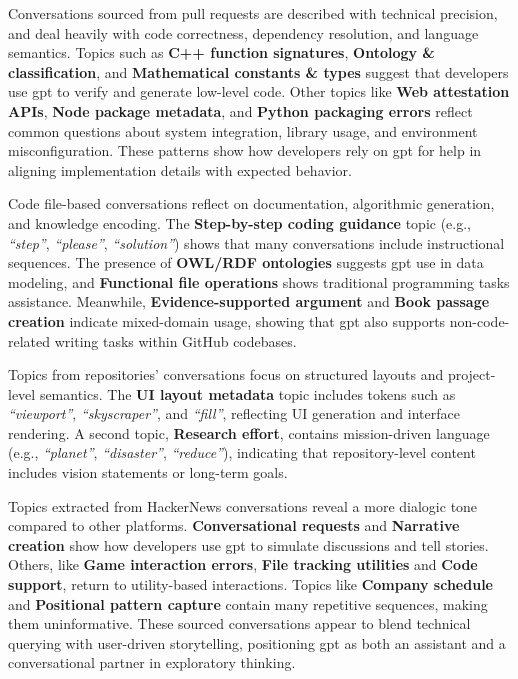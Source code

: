 Conversations sourced from pull requests are described with technical precision, and deal heavily with code correctness, dependency resolution, and language semantics. Topics such as \textbf{C++ function signatures}, \textbf{Ontology \& classification}, and \textbf{Mathematical constants \& types} suggest that developers use \acrshort{gpt} to verify and generate low-level code. Other topics like \textbf{Web attestation APIs}, \textbf{Node package metadata}, and \textbf{Python packaging errors} reflect common questions about system integration, library usage, and environment misconfiguration. These patterns show how developers rely on \acrshort{gpt} for help in aligning implementation details with expected behavior.

Code file-based conversations reflect on documentation, algorithmic generation, and knowledge encoding. The \textbf{Step-by-step coding guidance} topic (e.g., \textit{``step''}, \textit{``please''}, \textit{``solution''}) shows that many conversations include instructional sequences. The presence of \textbf{OWL/RDF ontologies} suggests \acrshort{gpt} use in data modeling, and \textbf{Functional file operations} shows traditional programming tasks assistance. Meanwhile, \textbf{Evidence-supported argument} and \textbf{Book passage creation} indicate mixed-domain usage, showing that \acrshort{gpt} also supports non-code-related writing tasks within GitHub codebases. 

Topics from repositories' conversations focus on structured layouts and project-level semantics. The \textbf{UI layout metadata} topic includes tokens such as \textit{``viewport''}, \textit{``skyscraper''}, and \textit{``fill''}, reflecting UI generation and interface rendering. A second topic, \textbf{Research effort}, contains mission-driven language (e.g., \textit{``planet''}, \textit{``disaster''}, \textit{``reduce''}), indicating that repository-level content includes vision statements or long-term goals.

Topics extracted from HackerNews conversations reveal a more dialogic tone compared to other platforms. \textbf{Conversational requests} and \textbf{Narrative creation} show how developers use \acrshort{gpt} to simulate discussions and tell stories. Others, like \textbf{Game interaction errors}, \textbf{File tracking utilities} and \textbf{Code support}, return to utility-based interactions. Topics like \textbf{Company schedule} and \textbf{Positional pattern capture} contain many repetitive sequences, making them uninformative. These sourced conversations appear to blend technical querying with user-driven storytelling, positioning \acrshort{gpt} as both an assistant and a conversational partner in exploratory thinking.

